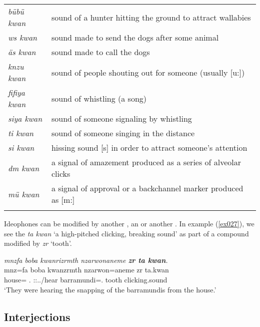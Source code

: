 {\begin{table}
\begin{tabularx}{\textwidth}{Xl}
		\tablevspace
		\multicolumn{2}{l}{{human made signal sounds}}\\ \midrule
		\emph{bübü kwan}&sound of a hunter hitting the ground to attract wallabies\\
		\emph{ws kwan}&sound made to send the dogs after some animal\\
		\emph{äs kwan}&sound made to call the dogs\\
		\emph{knzu kwan}&sound of people shouting out for someone (usually [u:])\\
		\emph{fifiya kwan}&sound of whistling (a song)\\
		\emph{siya kwan}&sound of someone signaling by whistling\\
		\emph{ti kwan}&sound of someone singing in the distance\\
		\emph{si kwan}&hissing sound [s] in order to attract someone's attention\\
		\emph{dm kwan}&a signal of amazement produced as a series of alveolar clicks\\
		\emph{mü kwan}&a signal of approval or a backchannel marker produced as [m:]\\
		\lspbottomrule
	\end{tabularx}
\end{table}}%

Ideophones can be modified by another , an  or another . In example (\ref{ex027}), we see the  \emph{ta kwan} `a high-pitched clicking, breaking sound' as part of a compound modified by \emph{zr} `tooth'.

\begin{exe}
	\ex \emph{mnzfa boba kwanrizrmth nzarwonaneme \textbf{zr ta kwan}.}\\
	\gll mnz=fa boba kwanzrmth nzarwon=aneme zr ta.kwan\\
	house=\Abl{} \Med{}.\Abl{} \Stpl:\Sbj:\Pst.\Dur.\Venit/hear barramundi=\Poss{}.\Nsg{} tooth {clicking.sound}\\
	\trans `They were hearing the snapping of the barramundis from the house.'\\ 
	\label{ex027}
\end{exe}

\subsection{Interjections} \label{interjectionsec}

